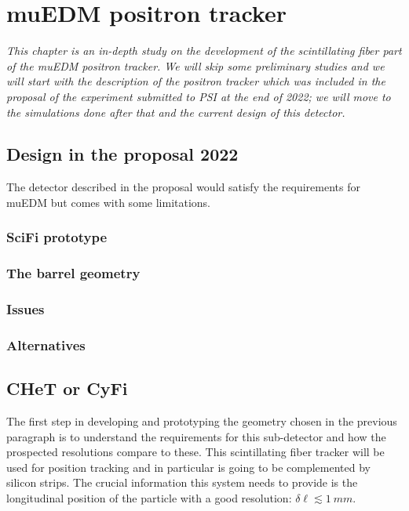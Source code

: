\chapter{muEDM positron tracker}
\begin{refsection}
{\itshape This chapter is an in-depth study on the development of the scintillating fiber part of the muEDM positron tracker. 
We will skip some preliminary studies and we will start with the description of the positron tracker which was included in the proposal of the experiment submitted to PSI at the end of 2022; we will move to the simulations done after that and the current design of this detector.}

\section{Design in the proposal 2022}
    The detector described in the proposal would satisfy the requirements for muEDM but comes with some limitations.
    \subsection{SciFi prototype}
    \subsection{The barrel geometry}
    \subsection{Issues}
    \subsection{Alternatives}

\section{CHeT or CyFi}
    The first step in developing and prototyping the geometry chosen in the previous paragraph is to understand the requirements for this sub-detector and how the prospected resolutions compare to these.
    This scintillating fiber tracker will be used for position tracking and in particular is going to be complemented by silicon strips. The crucial information this system needs to provide is the longitudinal position of the particle with a good resolution: $\delta \ell \lesssim \SI{1}{mm}$.


\end{refsection}
